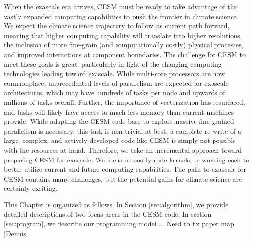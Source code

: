 When the exascale era arrives, CESM must be ready to take advantage of the vastly expanded computing capabilities to push the frontier in climate science.  We expect the climate science trajectory to follow its current path forward, meaning that higher computing capability will translate into higher resolutions, the inclusion of more fine-grain (and computationally costly) physical processes, and improved interactions at component boundaries. The challenge for CESM to meet these goals is great, particularly in light of the changing computing technologies leading toward exascale.  While multi-core processors are now commonplace, unprecedented levels of parallelism are expected for exascale architectures, which may have hundreds of tasks per node and upwards of millions of tasks overall.  Further, the importance of vectorization has resurfaced, and tasks will likely have access to much less memory than current machines provide.  While adapting the CESM code base to exploit massive fine-grained parallelism is necessary, this task is non-trivial at best; a complete re-write of a large, complex, and actively developed code like CESM is simply not possible with the resources at hand.  Therefore, we take an incremental approach toward preparing CESM for exascale. We focus on costly code kernels, re-working each to better utilize current and future computing capabilities.  The path to exascale for CESM contains many challenges, but the potential gains for climate science are certainly exciting.


This Chapter is organized as follows. In Section \ref{sec:algorithm}, we provide detailed descriptions of two focus areas in the CESM code. In section \ref{sec:program},  we describe our programming model ...{\color{red} Need to fix paper map [Dennis]}
